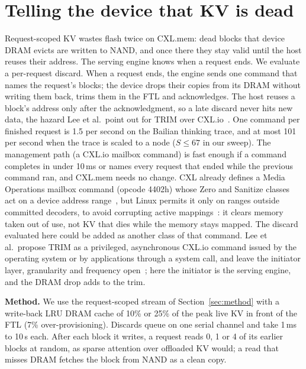 \documentclass[acmsmall,screen,review]{acmart}
\begin{document}
\section{Telling the device that KV is dead}
\label{sec:discard}
Request-scoped KV wastes flash twice on CXL.mem: dead blocks that device DRAM evicts are written to
NAND, and once there they stay valid until the host reuses their address. The serving engine knows
when a request ends. We evaluate a per-request discard. When a request ends, the
engine sends one command that names the request's blocks; the device drops their copies from its
DRAM without writing them back, trims them in the FTL and acknowledges. The host reuses a block's
address only after the acknowledgment, so a late discard never hits new data, the hazard Lee et al.\
point out for TRIM over CXL.io~\cite{trimcxl}. One command per finished request is 1.5
per second on the Bailian thinking trace, and at most 101 per second when the trace is scaled
to a node ($S \le 67$ in our sweep). The management path (a CXL.io mailbox command) is fast enough
if a command completes in under 10\,ms or names every request that ended while the previous command
ran, and CXL.mem needs no change. CXL already
defines a Media Operations mailbox command (opcode 4402h) whose Zero and Sanitize classes act on a
device address range~\cite{cxl40}, but Linux permits it only on ranges outside committed decoders, to
avoid corrupting active mappings~\cite{linux_mediaop}: it clears memory taken out of use, not KV that
dies while the memory stays mapped. The discard evaluated here could be added as another class of
that command. Lee
et al.\ propose TRIM as a privileged, asynchronous CXL.io command issued by the operating system or
by applications through a system call, and leave the initiator layer, granularity and frequency
open~\cite{trimcxl}; here the initiator is the serving
engine, and the DRAM drop adds to the trim.

\textbf{Method.} We use the request-scoped stream of Section~\ref{sec:method} with a write-back LRU
DRAM cache of 10\% or 25\% of the peak live KV in front of the FTL (7\% over-provisioning).
Discards queue on one serial channel and take 1\,ms to 10\,s each. After each block it writes, a
request reads 0, 1 or 4 of its earlier blocks at random, as sparse attention over offloaded KV would;
a read that misses DRAM fetches the block from NAND as a clean copy.
\end{document}
